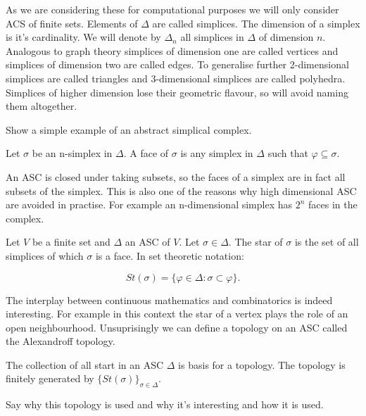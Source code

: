 As we are considering these for computational purposes we will only consider ACS of finite sets. Elements of $\Delta$ are called simplices. The dimension of a simplex is it's cardinality. We will denote by $\Delta_n$ all simplices in $\Delta$ of dimension $n$. Analogous to graph theory simplices of dimension one are called vertices and simplices of dimension two are called edges. To generalise further 2-dimensional simplices are called triangles and 3-dimensional simplices are called polyhedra. Simplices of higher dimension lose their geometric flavour, so will avoid naming them altogether.

\begin{ex} Show a simple example of an abstract simplical complex. \end{ex}


\begin{defn} Let $\sigma$ be an n-simplex in $\Delta$. A face of $\sigma$ is any simplex in $\Delta$ such that $\varphi \subseteq \sigma$. \end{defn}

An ASC is closed under taking subsets, so the faces of a simplex are in fact all subsets of the simplex. This is also one of the reasons why high dimensional ASC are avoided in practise. For example an n-dimensional simplex has $2^n$ faces in the complex.

\begin{defn} Let $V$ be a finite set and $\Delta$ an ASC of $V$. Let $\sigma \in \Delta$. The star of $\sigma$ is the set of all simplices of which $\sigma$ is a face. In set theoretic notation:\end{defn}

$$ St(\sigma) =  \{ \varphi \in \Delta : \sigma \subset \varphi \}. $$

The interplay between continuous mathematics and combinatorics is indeed interesting. For example in this context the star of a vertex plays the role of an open neighbourhood. Unsuprisingly we can define a topology on an ASC called the Alexandroff topology.


\begin{defn} The collection of all start in an ASC $\Delta$ is basis for a topology. The topology is finitely generated by $\{St(\sigma)\}_{\sigma \in \Delta}$.  \end{defn}

Say why this topology is used and why it's interesting and how it is used.


